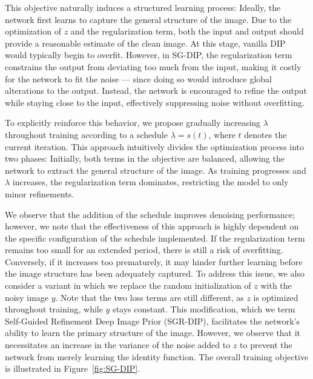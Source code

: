 This objective naturally induces a structured learning process:
Ideally, the network first learns to capture the general structure of the image.
Due to the optimization of $z$ and the regularization term, both the input and output should provide a reasonable estimate of the clean image.
At this stage, vanilla DIP would typically begin to overfit.
However, in SG-DIP, the regularization term constrains the output from deviating too much from the input, making it costly for the network to fit the noise --- since doing so would introduce global alterations to the output.
Instead, the network is encouraged to refine the output while staying close to the input, effectively suppressing noise without overfitting.

To explicitly reinforce this behavior, we propose gradually increasing $\lambda$ throughout training according to a schedule $\lambda = s(t)$, where $t$ denotes the current iteration.
This approach intuitively divides the optimization process into two phases:
Initially, both terms in the objective are balanced, allowing the network to extract the general structure of the image. As training progresses and $\lambda$ increases, the regularization term dominates, restricting the model to only minor refinements.

We observe that the addition of the schedule improves denoising performance; however, we note that the effectiveness of this approach is highly dependent on the specific configuration of the schedule implemented.
If the regularization term remains too small for an extended period, there is still a risk of overfitting.
Conversely, if it increases too prematurely, it may hinder further learning before the image structure has been adequately captured.
To address this issue, we also consider a variant in which we replace the random initialization of $z$ with the noisy image $y$.
Note that the two loss terms are still different, as $z$ is optimized throughout training, while $y$ stays constant.
This modification, which we term Self-Guided Refinement Deep Image Prior (SGR-DIP), facilitates the network's ability to learn the primary structure of the image. 
However, we observe that it necessitates an increase in the variance of the noise added to $z$ to prevent the network from merely learning the identity function.
The overall training objective is illustrated in Figure~\ref{fig:SG-DIP}.

